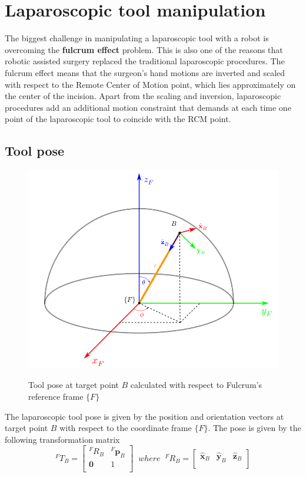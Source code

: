 \section{Laparoscopic tool manipulation}

The biggest challenge in manipulating a laparoscopic tool with a robot is overcoming the \textbf{fulcrum effect} problem. This is also one of the reasons that 
robotic assisted surgery replaced the traditional laparoscopic procedures. The fulcrum effect means that the surgeon's hand motions are inverted and scaled 
with respect to the Remote Center of Motion point, which lies approximately on the center of the incision. Apart from the scaling and inversion, laparoscopic 
procedures add an additional motion constraint that demands at each time one point of the laparoscopic tool to coincide with the RCM point.

\subsection{Tool pose}

\begin{center}
\begin{figure}[H]
\centering
\includegraphics[width=12cm]{images/fulcrum-space.png}\\
\caption{Tool pose at target point $B$ calculated with respect to Fulcrum's reference frame $\lbrace F \rbrace$}
\end{figure}
\end{center}

The laparoscopic tool pose is given by the position and orientation vectors at target point $B$ with respect to the coordinate frame $\lbrace F \rbrace$.
The pose is given by the following transformation matrix
\[
{}^{F}T_B = \begin{bmatrix}
{}^{F}R_B & {}^{F}\mathbf{p}^{}_B \\
\mathbf{0} & 1 \\
\end{bmatrix}
\;\; where \;\;
{}^{F}R_B = \begin{bmatrix}
\hat{\mathbf{x}}^{}_B & \hat{\mathbf{y}}^{}_B & \hat{\mathbf{z}}^{}_B \\
\end{bmatrix}
\]

